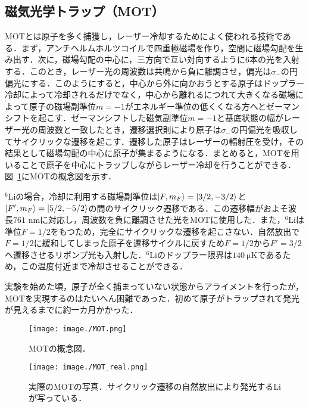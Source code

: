 \documentclass[11pt,a4j,notitlepage]{jreport}
\newcommand{\fig}[1]{図~\ref{#1}}	%
\begin{document}
\subsection{磁気光学トラップ（MOT）}
MOTとは原子を多く捕獲し，レーザー冷却するためによく使われる技術である．まず，アンチヘルムホルツコイルで四重極磁場を作り，空間に磁場勾配を生み出す．次に，磁場勾配の中心に，三方向で互い対向するように$6$本の光を入射する．このとき，レーザー光の周波数は共鳴から負に離調させ，偏光は$\sigma_-$の円偏光にする．このようにすると，中心から外に向かおうとする原子はドップラー冷却によって冷却されるだけでなく，中心から離れるにつれて大きくなる磁場によって原子の磁場副準位$m=-1$がエネルギー準位の低くくなる方へとゼーマンシフトを起こす．ゼーマンシフトした磁気副準位$m=-1$と基底状態の幅がレーザー光の周波数と一致したとき，遷移選択則により原子は$\sigma_-$の円偏光を吸収してサイクリックな遷移を起こす．遷移した原子はレーザーの輻射圧を受け，その結果として磁場勾配の中心に原子が集まるようになる．まとめると，MOTを用いることで原子を中心にトラップしながらレーザー冷却を行うことができる．\fig{fig3.3.4}にMOTの概念図を示す．

$^6$Liの場合，冷却に利用する磁場副準位は$\ket{F, m_F}=\ket{3/2, -3/2}$と$\ket{F', m_F}=\ket{5/2, -5/2}$の間のサイクリック遷移である．この遷移幅がおよそ波長$761$ nmに対応し，周波数を負に離調させた光をMOTに使用した．また，$^6$Liは準位$F=1/2$をもつため，完全にサイクリックな遷移を起こさない．自然放出で$F=1/2$に緩和してしまった原子を遷移サイクルに戻すため$F=1/2$から$F'=3/2$へ遷移させるリポンプ光も入射した．$^6$Liのドップラー限界は$140 \ \mathrm{\mu K}$であるため，この温度付近まで冷却させることができる．

実験を始めた頃，原子が全く捕まっていない状態からアライメントを行ったが，MOTを実現するのはたいへん困難であった．初めて原子がトラップされて発光が見えるまでに約一カ月かかった．
\begin{figure}[h]
	\centering
		\texttt{[image: image./MOT.png]}
	\caption{MOTの概念図．}
	\label{fig3.3.4}
\end{figure}
\begin{figure}[H]
	\centering
		\texttt{[image: image./MOT\_real.png]}
	\caption{実際のMOTの写真．サイクリック遷移の自然放出により発光するLiが写っている．}
	\label{fig3.3.5}
\end{figure}
\end{document}
